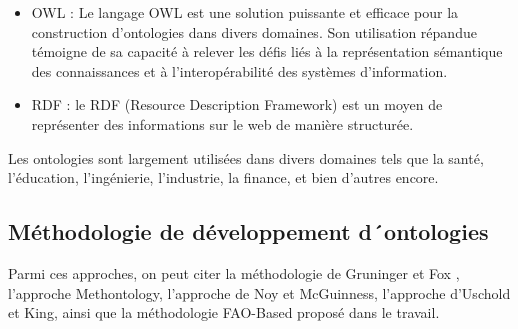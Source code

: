 \documentclass{article}
\begin{document}
	\begin{itemize}
		\item OWL : Le langage OWL est une solution puissante et efficace pour la construction d'ontologies
		dans divers domaines. Son utilisation répandue témoigne de sa capacité à relever les défis liés
		à la représentation sémantique des connaissances et à l'interopérabilité des systèmes d'information.
		\item RDF : le RDF (Resource Description Framework) est un moyen de représenter des informations sur le web de manière structurée.
	\end{itemize}

	Les ontologies sont largement utilisées dans divers domaines tels que la santé, l'éducation,
	l'ingénierie, l'industrie, la finance, et bien d'autres encore.
	
	
	\subsection{Méthodologie de développement d´ontologies}
	Parmi ces approches, on peut citer la méthodologie de Gruninger et Fox
	, l'approche Methontology, l'approche de Noy et McGuinness, l'approche d'Uschold
	et King, ainsi que la méthodologie FAO-Based proposé dans le travail.
	
\end{document}
